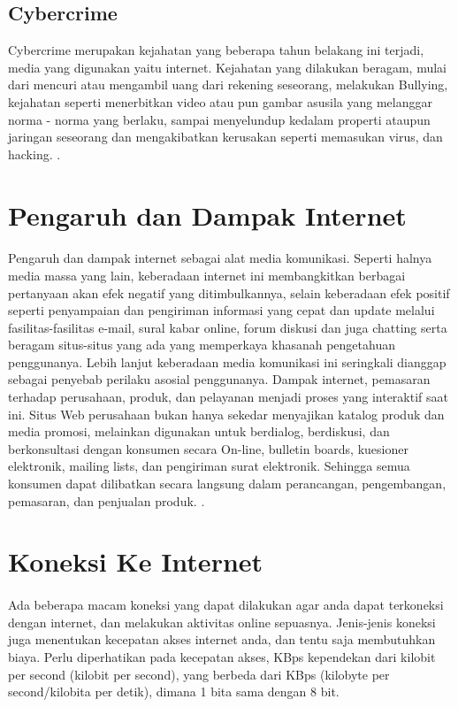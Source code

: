 \subsection{Cybercrime}
 Cybercrime merupakan kejahatan yang beberapa tahun belakang ini terjadi, media yang digunakan yaitu internet. Kejahatan yang dilakukan beragam, mulai dari mencuri atau mengambil uang dari rekening seseorang, melakukan Bullying, kejahatan seperti menerbitkan video atau pun gambar asusila yang melanggar norma -  norma yang berlaku, sampai menyelundup kedalam properti ataupun jaringan seseorang dan mengakibatkan kerusakan seperti memasukan virus, dan hacking.
\cite{yar2005novelty}.

\section{Pengaruh dan Dampak Internet}
\paragraph{} Pengaruh dan dampak internet sebagai alat media komunikasi. Seperti halnya media massa yang lain, keberadaan internet ini membangkitkan berbagai pertanyaan akan efek negatif yang ditimbulkannya, selain keberadaan efek positif seperti penyampaian dan pengiriman informasi yang cepat dan update melalui fasilitas-fasilitas e-mail, sural kabar online, forum diskusi dan juga chatting serta beragam situs-situs yang ada yang memperkaya khasanah pengetahuan penggunanya. Lebih lanjut keberadaan media komunikasi ini seringkali dianggap sebagai penyebab perilaku asosial penggunanya.
Dampak internet, pemasaran terhadap perusahaan, produk, dan pelayanan menjadi proses yang interaktif saat ini. Situs Web perusahaan bukan hanya sekedar menyajikan katalog produk dan media promosi, melainkan digunakan untuk berdialog, berdiskusi, dan berkonsultasi dengan konsumen secara On-line, bulletin boards, kuesioner elektronik, mailing lists, dan pengiriman surat elektronik. Sehingga semua konsumen dapat dilibatkan secara langsung dalam perancangan, pengembangan, pemasaran, dan penjualan produk.
\cite{surya2009pola}.

\section{Koneksi Ke Internet}
\paragraph{} Ada beberapa macam koneksi yang dapat dilakukan agar anda dapat terkoneksi dengan internet, dan melakukan aktivitas online sepuasnya. Jenis-jenis koneksi juga menentukan kecepatan akses internet anda, dan tentu saja membutuhkan biaya. Perlu diperhatikan pada kecepatan akses, KBps kependekan dari kilobit per second (kilobit per second), yang berbeda dari KBps (kilobyte per second/kilobita per detik), dimana 1 bita sama dengan 8 bit.

